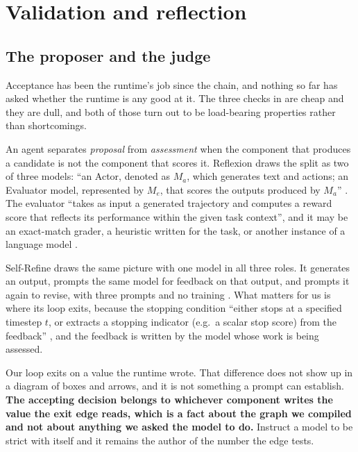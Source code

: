 \section{Validation and reflection}
\label{sec:validation}

\subsection{The proposer and the judge}
\label{sec:validation-actor}

Acceptance has been the runtime's job since the chain, and nothing so far has asked whether the
runtime is any good at it. The three checks in  are cheap and they are dull, and
both of those turn out to be load-bearing properties rather than shortcomings.

\begin{definition}
\label{def:actor-evaluator}
An agent separates \emph{proposal} from \emph{assessment} when the component that produces a candidate is not the component that scores it. Reflexion draws the split as two of three models: ``an Actor, denoted as $M_a$, which generates text and actions; an Evaluator model, represented by $M_e$, that scores the outputs produced by $M_a$'' \citep[\S3]{shinn2023reflexion}. The evaluator ``takes as input a generated trajectory and computes a reward score that reflects its performance within the given task context'', and it may be an exact-match grader, a heuristic written for the task, or another instance of a language model \citep[\S3]{shinn2023reflexion}.
\end{definition}

Self-Refine draws the same picture with one model in all three roles. It generates an output,
prompts the same model for feedback on that output, and prompts it again to revise, with three
prompts and no training \citep[\S2]{madaan2023selfrefine}. What matters for us is where its loop
exits, because the stopping condition ``either stops at a specified timestep $t$, or extracts a
stopping indicator (e.g.\ a scalar stop score) from the feedback''
\citep[\S2]{madaan2023selfrefine}, and the feedback is written by the model whose work is being
assessed.

Our loop exits on a value the runtime wrote. That difference does not show up in a diagram of boxes
and arrows, and it is not something a prompt can establish. \textbf{The accepting decision belongs
to whichever component writes the value the exit edge reads, which is a fact about the graph we
compiled and not about anything we asked the model to do.} Instruct a model to be strict with itself
and it remains the author of the number the edge tests.

